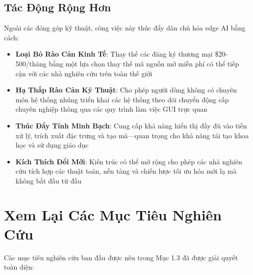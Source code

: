 \subsection{Tác Động Rộng Hơn}
Ngoài các đóng góp kỹ thuật, công việc này thúc đẩy dân chủ hóa edge AI bằng cách:
\begin{itemize}
    \item \textbf{Loại Bỏ Rào Cản Kinh Tế}: Thay thế các đăng ký thương mại \$20-500/tháng bằng một lựa chọn thay thế mã nguồn mở miễn phí có thể tiếp cận với các nhà nghiên cứu trên toàn thế giới
    \item \textbf{Hạ Thấp Rào Cản Kỹ Thuật}: Cho phép người dùng không có chuyên môn hệ thống nhúng triển khai các hệ thống theo dõi chuyển động cấp chuyên nghiệp thông qua các quy trình làm việc GUI trực quan
    \item \textbf{Thúc Đẩy Tính Minh Bạch}: Cung cấp khả năng hiển thị đầy đủ vào tiền xử lý, trích xuất đặc trưng và tạo mã—quan trọng cho khả năng tái tạo khoa học và sử dụng giáo dục
    \item \textbf{Kích Thích Đổi Mới}: Kiến trúc có thể mở rộng cho phép các nhà nghiên cứu tích hợp các thuật toán, nền tảng và chiến lược tối ưu hóa mới lạ mà không bắt đầu từ đầu
\end{itemize}

\section{Xem Lại Các Mục Tiêu Nghiên Cứu}

Các mục tiêu nghiên cứu ban đầu được nêu trong Mục 1.3 đã được giải quyết toàn diện:

